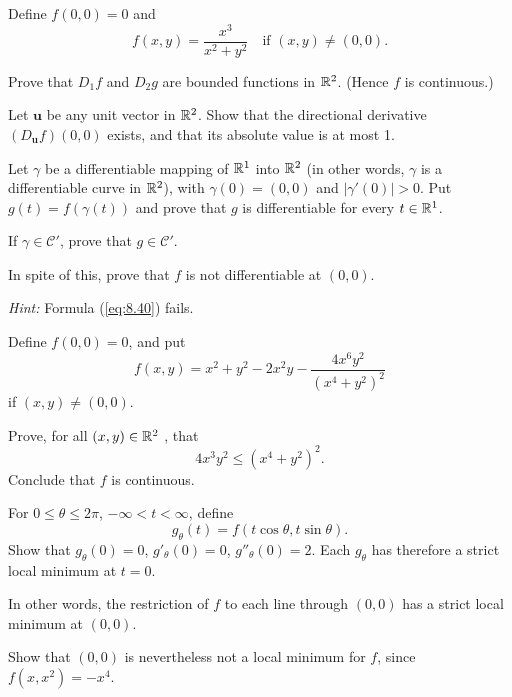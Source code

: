 \begin{myexercise}
    \label{ex:9.14}
    Define $f(0, 0) = 0$ and
    \begin{equation*}
        f(x, y) = \frac{x^3}{x^2+y^2}
        \quad\text{if }(x, y) \neq (0, 0).
    \end{equation*}
    \begin{asparaenum}[(a)]
        \item Prove that $D_1 f$ and $D_2 g$ are bounded functions in ${\protect\mathbb R}^2$. (Hence $f$ is continuous.)
        \item Let $\mathbf{u}$ be any unit vector in ${\protect\mathbb R}^2$. Show that the directional derivative $(D_{\mathbf{u}}f)(0, 0)$ exists, and that its absolute value is at most 1.
        \item Let $\gamma$ be a differentiable mapping of ${\protect\mathbb R}^1$ into ${\protect\mathbb R}^2$ 
        (in other words, $\gamma$ is a differentiable curve in ${\protect\mathbb R}^2$), 
        with $\gamma(0) = (0, 0)$ and $| \gamma'(0) |> 0$. 
        Put $g(t) =  f(\gamma(t))$ and prove that $g$ is differentiable for every $t \in {\protect\mathbb R}^1$.

        If $\gamma \in \mathscr{C}'$, prove that $g \in \mathscr{C}'$.
        \item In spite of this, prove that $f$ is not differentiable at $(0, 0)$.
    \end{asparaenum}
    \emph{Hint:} Formula (\ref{eq:8.40}) fails.
\end{myexercise}


\begin{myexercise}
    \label{ex:9.15}
    Define $f(0, 0) = 0$, and put
    \begin{equation*}
        f(x,y)=x^2+y^2-2x^2y-\frac{4x^6y^2}{(x^4+y^2)^2}
    \end{equation*}
    if $(x,y)\neq (0,0)$.
    \begin{asparaenum}[(a)]
        \item Prove, for all $(x, y) \in {\protect\mathbb R}^2$ , that
        \begin{equation*}
            4x^3y^2 \leq (x^4+y^2)^2.
        \end{equation*}
        Conclude that $f$ is continuous.
        \item For $0 \leq \theta \leq 2\pi$, $-\infty < t < \infty$, define
        \begin{equation*}
            g_{\theta}(t) = f(t\cos \theta, t\sin \theta).
        \end{equation*}
        Show that 
        $g_{\theta} (0) = 0$, 
        $g'_{\theta} (0) = 0$, 
        $g''_{\theta} (0) = 2$. 
        Each $g_{\theta}$ has therefore a strict local minimum at $t = 0$.

        In other words, the restriction of $f$ to each line through $(0, 0)$ has a strict local minimum at $(0, 0)$.
        \item Show that $(0, 0)$ is nevertheless not a local minimum for $f$, since $f(x, x^2) = -x^4$.
    \end{asparaenum}
\end{myexercise}


